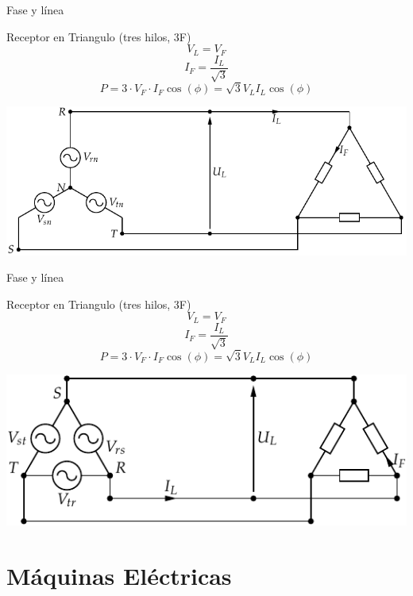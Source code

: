 \documentclass[xcolor={usenames,svgnames,dvipsnames}]{beamer}
\begin{document}
\begin{frame}[label={sec:org4c8d5a7}]{Fase y línea}
\begin{block}{Receptor en Triangulo (tres hilos, 3F)}
$$V_{L}=V_{F}$$ $$I_{F}=\frac{I_{L}}{\sqrt{3}}$$
$$P=3\cdot V_{F}\cdot I_{F}\cos(\phi)=\sqrt{3}V_{L}I_{L}\cos(\phi)$$
\begin{center}
\includegraphics[width=.9\linewidth]{../figs/RedTrifasicaEstrella_CargaTriangulo.pdf}
\end{center}
\end{block}
\end{frame}

\begin{frame}[label={sec:org838aaea}]{Fase y línea}
\begin{block}{Receptor en Triangulo (tres hilos, 3F)}
$$V_{L}=V_{F}$$ $$I_{F}=\frac{I_{L}}{\sqrt{3}}$$
$$P=3\cdot V_{F}\cdot I_{F}\cos(\phi)=\sqrt{3}V_{L}I_{L}\cos(\phi)$$
\begin{center}
\includegraphics[width=.9\linewidth]{../figs/RedTrifasicaTriangulo.pdf}
\end{center}
\end{block}
\end{frame}

\section{Máquinas Eléctricas}
\label{sec:org27e2305}
\end{document}
